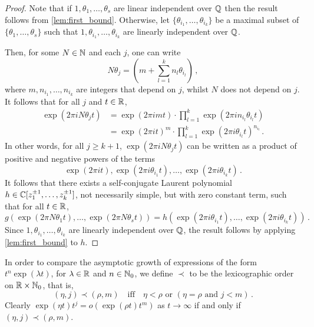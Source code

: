 \begin{proof}
Note that if $1, \theta_{1}, \ldots, \theta_{s}$ are linear independent over $\mathbb{Q}$ then the result follows from \cref{lem:first_bound}.
Otherwise, let $\lbrace \theta_{i_{1}}, \ldots, \theta_{i_{k}} \rbrace$ be a maximal subset of $\lbrace \theta_{1}, \ldots, \theta_{s} \rbrace$ such that $1, \theta_{i_{1}}, \ldots, \theta_{i_{k}}$ are linearly independent over $\mathbb{Q}$.

Then, for some $N\in\mathbb{N}$ and each $j$, one can write
\begin{equation*}
N\theta_{j}= \left( m  +\sum\limits_{l=1}^{k} n_{l}\theta_{i_{l}} \right) \, ,
\end{equation*}
where $m,n_{i_{1}},\ldots,n_{i_{k}}$ are integers that depend on $j$, whilst $N$ does not depend on $j$.  It follows that for all $j$ and $t \in \mathbb{R}$,
\begin{align*}
\exp(2 \pi i N\theta_{j} t) &= \exp( 2 \pi i m t) \cdot \prod\limits_{l=1}^{k} \exp(2 \pi i  n_{i_{l}} \theta_{i_{l}} t) \\
&= \exp(2 \pi i t)^{m} \cdot \prod\limits_{l=1}^{k} \exp(2 \pi i \theta_{i_{l}} t)^{n_{i_{l}}}  \, .
\end{align*}
In other words, for all $j \geq k+1$, $\exp(2 \pi i N \theta_{j} t)$ can be written as a product of positive and negative powers of the terms
\begin{equation*}
  \exp(2 \pi i t), \exp(2 \pi i \theta_{i_{1}} t), \ldots, \exp(2 \pi i \theta_{i_{k}} t) \, .
\end{equation*}
It follows that there exists a self-conjugate Laurent polynomial
$h\in\mathbb{C} [z_1^{\pm 1},\ldots,z_k^{\pm 1}]$, not necessarily
simple, but with zero constant term, such that for all
$t\in \mathbb{R}$,
\[ g(\exp(2 \pi N \theta_{1} t), \ldots, \exp(2 \pi N \theta_{s} t)) =
  h(\exp(2 \pi i \theta_{i_{1}} t),\ldots,\exp(2 \pi i \theta_{i_{k}} t)) \, .\]
Since $1, \theta_{i_{1}}, \ldots, \theta_{i_{k}}$ are linearly independent over $\mathbb{Q}$, the result follows by applying \cref{lem:first_bound}
to $h$.
\end{proof}


In order to compare the asymptotic growth of expressions of the form
$t^{n}\exp(\lambda t)$, for $\lambda\in\mathbb{R}$ and
$n\in\mathbb{N}_0$, we define $\prec$ to be the lexicographic order on
$\mathbb{R}\times\mathbb{N}_{0}$, that is,
\begin{equation*}
(\eta,j)\prec (\rho,m) \quad \mbox{iff} \quad
\eta<\rho \mbox{ or } (\eta = \rho \mbox{ and } j< m) \, .
\end{equation*}
Clearly $\exp(\eta t)t^{j}=o(\exp(\rho t)t^{m})$ as $t\rightarrow \infty$ if and only if $(\eta,j)\prec (\rho,m)$.

